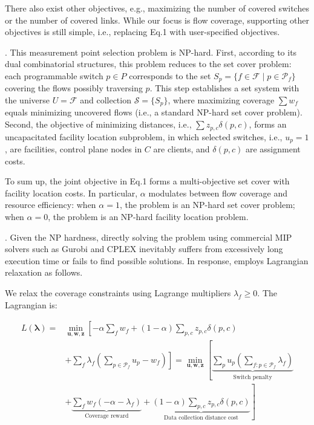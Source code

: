 There also exist other objectives, e.g., maximizing the number of covered switches or the number of covered links. While our focus is flow coverage, supporting other objectives is still simple, i.e., replacing Eq.1 with user-specified objectives. 

. This measurement point selection problem is NP-hard. First, according to its dual combinatorial structures, this problem reduces to the set cover problem: each programmable switch $p \in P$ corresponds to the set $S_p = \{ f \in \mathcal{F} \mid p \in \mathcal{P}_f \}$ covering the flows possibly traversing $p$. This step establishes a set system with the universe $U = \mathcal{F}$ and collection $\mathcal{S} = \{ S_p \}$, where maximizing coverage $\sum w_f$ equals minimizing uncovered flows (i.e., a standard NP-hard set cover problem). Second, the objective of minimizing distances, i.e., $\sum z_{p,c} \delta(p,c)$, forms an uncapacitated facility location subproblem, in which selected switches, i.e., $u_p=1$, are facilities, control plane nodes in $C$ are clients, and $\delta(p,c)$ are assignment costs. 

To sum up, the joint objective in Eq.1 forms a multi-objective set cover with facility location costs. In particular, $\alpha$ modulates between flow coverage and resource efficiency: when $\alpha=1$, the problem is an NP-hard set cover problem; when $\alpha=0$, the problem is an NP-hard facility location problem.  


. Given the NP hardness, directly solving the problem using commercial MIP solvers such as Gurobi \cite{gurobi} and CPLEX \cite{cplex} inevitably suffers from excessively long execution time or fails to find possible solutions. In response, \sysname employs Lagrangian relaxation as follows.

We relax the coverage constraints using Lagrange multipliers \(\lambda_f \geq 0\). The Lagrangian is:

\vspace{-10pt}
{\footnotesize
\begin{align}
L(\boldsymbol{\lambda}) = &\min_{\mathbf{u},\mathbf{w},\mathbf{z}} \left[ 
-\alpha \sum_{f} w_f + (1-\alpha) \sum_{p,c} z_{p,c} \delta(p,c) \right. \nonumber \\ &\left. + \sum_{f} \lambda_f \left( \sum_{p \in \mathcal{P}_f} u_p - w_f \right)
\right] 
= \min_{\mathbf{u},\mathbf{w},\mathbf{z}} \left[ 
\underbrace{\sum_{p} u_p \left( \sum_{f: p \in \mathcal{P}_f} \lambda_f \right)}_{\text{Switch penalty}} \right. \nonumber \\ &+ \left.
\underbrace{\sum_{f} w_f (-\alpha - \lambda_f)}_{\text{Coverage reward}} +
\underbrace{(1-\alpha) \sum_{p,c} z_{p,c} \delta(p,c)}_{\text{Data collection distance cost}}
\right]
\end{align}}
\vspace{-7pt}

